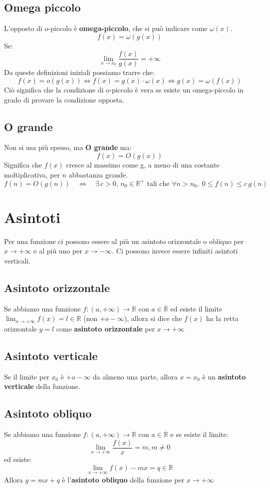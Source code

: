 \documentclass[12pt,a4paper]{article}
\let\oldsection\section
\renewcommand{\section}{\clearpage\oldsection}
\begin{document}
\subsection{Omega piccolo}
L'opposto di o-piccolo è \textbf{omega-piccolo}, che si può indicare come $\omega(x)$.
\[
f(x) = \omega(g(x))
\]
Se:
\[
\lim_{x \to x_0} \frac{f(x)}{g(x)} = +\infty
\]
Da queste definizioni iniziali possiamo trarre che:
\[
f(x) = o(g(x)) \Longleftrightarrow f(x) = g(x) \cdot \omega(x) \Longleftrightarrow g(x) = \omega(f(x))
\]
Ciò significa che la condizione di o-piccolo è vera se esiste un omega-piccolo in grado di provare la condizione opposta.
\subsection{O grande}
Non si usa più spesso, ma \textbf{O grande} ma:
\[
f(x) = O(g(x))
\]
Significa che $f(x)$ cresce al massimo come g, a meno di una costante moltiplicativa, per $n$ abbastanza grande.
\[
f(n) = O(g(n))
\quad \Longleftrightarrow \quad
\exists\, c > 0,\, n_0 \in \mathbb{R}^+ \text{ tali che } 
\forall n > n_0,\; 0 \le f(n) \le c\, g(n)
\]

\section{Asintoti}

Per una funzione ci possono essere al più un asintoto orizzontale o obliquo per $x \rightarrow +\infty$
e al più uno per $x \rightarrow -\infty$.
Ci possono invece essere infiniti asintoti verticali.

\subsection{Asintoto orizzontale}
Se abbiamo una funzione $f:(a,+\infty) \rightarrow \mathbb{R}$ con $a \in \overline{\mathbb{R}}$ ed esiste il limite
$\lim_{x \to +\infty} f(x) = l \in \mathbb{R}$ (non $+ o - \infty$), allora si dice che $f(x)$ ha la retta orizzontale $y=l$ come \textbf{asintoto orizzontale} per $x \rightarrow +\infty$

\subsection{Asintoto verticale}
Se il limite per $x_0$ è $+ o - \infty$ da almeno una parte, allora $x = x_0$ è un \textbf{asintoto verticale} della funzione.

\subsection{Asintoto obliquo}
Se abbiamo una funzione $f:(a,+\infty) \rightarrow \mathbb{R}$ con $a \in \overline{\mathbb{R}}$ e se esiste il limite:\\
\[\lim_{x \to +\infty} \frac{f(x)}{x} = m, m \ne 0\]
ed esiste:\\
\[\lim_{x \to +\infty} f(x) - mx = q \in \mathbb{R}\]
Allora $y = mx + q$ è l'\textbf{asintoto obliquo} della funzione per $x \rightarrow + \infty$
\end{document}
